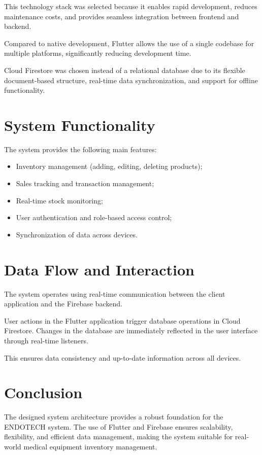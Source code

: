 This technology stack was selected because it enables rapid development, reduces maintenance costs, and provides seamless integration between frontend and backend.

Compared to native development, Flutter allows the use of a single codebase for multiple platforms, significantly reducing development time.

Cloud Firestore was chosen instead of a relational database due to its flexible document-based structure, real-time data synchronization, and support for offline functionality.

\section{System Functionality}

The system provides the following main features:

\begin{itemize}
    \item Inventory management (adding, editing, deleting products);
    \item Sales tracking and transaction management;
    \item Real-time stock monitoring;
    \item User authentication and role-based access control;
    \item Synchronization of data across devices.
\end{itemize}

\section{Data Flow and Interaction}

The system operates using real-time communication between the client application and the Firebase backend.

User actions in the Flutter application trigger database operations in Cloud Firestore. Changes in the database are immediately reflected in the user interface through real-time listeners.

This ensures data consistency and up-to-date information across all devices.

\section{Conclusion}

The designed system architecture provides a robust foundation for the ENDOTECH system. The use of Flutter and Firebase ensures scalability, flexibility, and efficient data management, making the system suitable for real-world medical equipment inventory management.